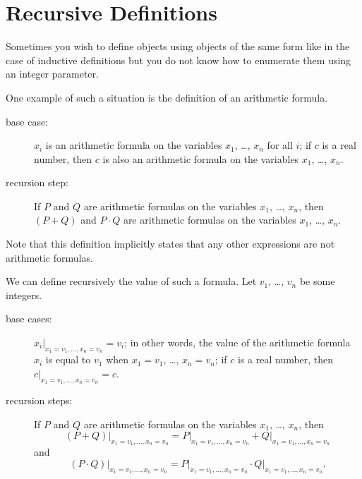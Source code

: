\section{Recursive Definitions}
Sometimes you wish to define objects using objects of the same form like in the
case of inductive definitions but you do not know how to enumerate them using
an integer parameter.

One example of such a situation is the definition of an arithmetic formula.
\begin{description}
  \item[base case:] $x_i$ is an arithmetic formula on the variables $x_1$,
    \dots, $x_n$ for all $i$; if $c$ is a real number, then $c$ is also
    an arithmetic formula on the variables $x_1$, \dots, $x_n$.
  \item[recursion step:] If $P$ and $Q$ are arithmetic formulas on the variables
    $x_1$, \dots, $x_n$, then $(P + Q)$ and $P \cdot Q$ are arithmetic formulas
    on the variables $x_1$, \dots, $x_n$.
\end{description}
Note that this definition implicitly states that any other expressions are not
arithmetic formulas.

We can define recursively the value of such a formula. Let $v_1$, \dots, $v_n$
be some integers.
\begin{description}
  \item[base cases:] $x_i\big\rvert_{x_1 = v_1, \dots, x_n = v_n} = v_i$; in
    other words, the value of the arithmetic formula $x_i$ is equal to $v_1$
    when $x_1 = v_1$, \dots, $x_n = v_n$; if $c$ is a real number, then
    $c\rvert_{x_1 = v_1, \dots, x_n = v_n} = c$.
  \item[recursion steps:] If $P$ and $Q$ are arithmetic formulas on the
    variables $x_1$, \dots, $x_n$, then
    \[
      (P + Q)\big\rvert_{x_1 = v_1, \dots, x_n = v_n} =
      P\big\rvert_{x_1 = v_1, \dots, x_n = v_n} +
      Q\big\rvert_{x_1 = v_1, \dots, x_n = v_n}
    \]
    and
    \[
      (P \cdot Q)\big\rvert_{x_1 = v_1, \dots, x_n = v_n} =
      P\big\rvert_{x_1 = v_1, \dots, x_n = v_n} \cdot
      Q\big\rvert_{x_1 = v_1, \dots, x_n = v_n}.
    \]
\end{description}

